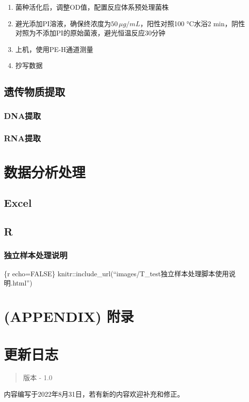 \documentclass[
]{book}
\providecommand{\tightlist}{%
  \setlength{\itemsep}{0pt}\setlength{\parskip}{0pt}}
\begin{document}
\begin{enumerate}
\def\labelenumi{\arabic{enumi}.}
\tightlist
\item
  菌种活化后，调整OD值，配置反应体系预处理菌株
\item
  避光添加PI溶液，确保终浓度为\(50\,\mu g/mL\)，阳性对照100 °C水浴2
  min，阴性对照为不添加PI的原始菌液，避光恒温反应30分钟
\item
  上机，使用PE-H通道测量
\item
  抄写数据
\end{enumerate}

\hypertarget{ux9057ux4f20ux7269ux8d28ux63d0ux53d6}{%
\section{遗传物质提取}\label{ux9057ux4f20ux7269ux8d28ux63d0ux53d6}}

\hypertarget{dnaux63d0ux53d6}{%
\subsection{DNA提取}\label{dnaux63d0ux53d6}}

\hypertarget{rnaux63d0ux53d6}{%
\subsection{RNA提取}\label{rnaux63d0ux53d6}}

\hypertarget{dataanalysis}{%
\chapter{数据分析处理}\label{dataanalysis}}

\hypertarget{excel}{%
\section{Excel}\label{excel}}

\hypertarget{r}{%
\section{R}\label{r}}

\hypertarget{ux72ecux7acbux6837ux672cux5904ux7406ux8bf4ux660e}{%
\subsection{独立样本处理说明}\label{ux72ecux7acbux6837ux672cux5904ux7406ux8bf4ux660e}}

\{r echo=FALSE\}
knitr::include\_url(``images/T\_test独立样本处理脚本使用说明.html'')

\hypertarget{appendix-ux9644ux5f55}{%
\chapter*{(APPENDIX) 附录}\label{appendix-ux9644ux5f55}}

\hypertarget{updatelog}{%
\chapter{更新日志}\label{updatelog}}

\begin{quote}
版本 - 1.0
\end{quote}

内容编写于2022年8月31日，若有新的内容欢迎补充和修正。

\backmatter
\end{document}
